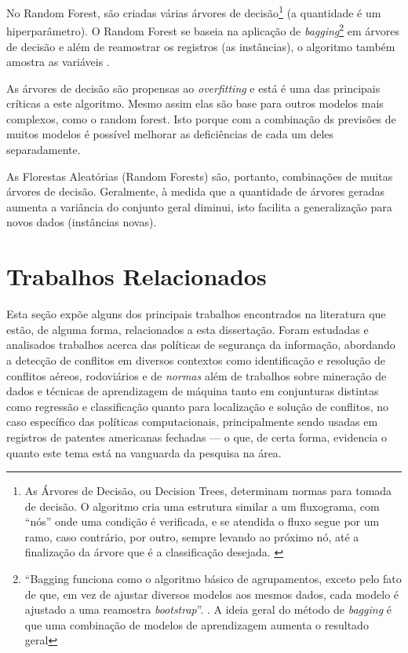 No Random Forest, são criadas várias árvores de decisão\footnote{As Árvores de Decisão, ou Decision Trees, determinam normas para tomada de decisão. O algoritmo cria uma estrutura similar a um fluxograma, com ``nós'' onde uma condição é verificada, e se atendida o fluxo segue por um ramo, caso contrário, por outro, sempre levando ao próximo nó, até a finalização da árvore que é a classificação desejada. \cite{classification2013}} (a quantidade é um hiperparâmetro). O Random Forest se baseia na aplicação de \textit{bagging}\footnote{``Bagging funciona como o algoritmo básico de agrupamentos, exceto pelo fato de que, em vez de ajustar diversos modelos aos mesmos dados, cada modelo é ajustado a uma reamostra \textit{bootstrap}''. \cite[p.237]{bruce_estatistica_2019}. A ideia geral do método de \textit{bagging} é que uma combinação de modelos de aprendizagem aumenta o resultado geral} em árvores de decisão e além de reamostrar os registros (as instâncias), o algoritmo também amostra as variáveis \cite[p. 237 e 238]{bruce_estatistica_2019}.

As árvores de decisão são propensas ao \textit{overfitting} e está é uma das principais críticas a este algoritmo. Mesmo assim elas são base para outros modelos mais complexos, como o random forest. Isto porque com a combinação ds previsões de muitos modelos é possível melhorar as deficiências de cada um deles separadamente. 

As Florestas Aleatórias (Random Forests) são, portanto,  combinações de muitas árvores de decisão. Geralmente, à medida que a quantidade de árvores geradas aumenta a variância do conjunto geral diminui, isto facilita a generalização para novos dados (instâncias novas).

\section{Trabalhos Relacionados}\label{trabalhos_relacionados}
Esta seção expõe alguns dos principais trabalhos encontrados na literatura que estão, de alguma forma, relacionados a esta dissertação. Foram estudadas e analisados trabalhos acerca das políticas de segurança da informação, abordando a detecção de conflitos em diversos contextos como identificação e resolução de conflitos aéreos, rodoviários e de \textit{normas} além de trabalhos sobre mineração de dados e técnicas de aprendizagem de máquina tanto em conjunturas distintas como regressão e classificação quanto para localização e solução de conflitos, no caso específico das políticas computacionais, principalmente sendo usadas em registros de patentes americanas fechadas --- o que, de certa forma, evidencia o quanto este tema está na vanguarda da pesquisa na área.

